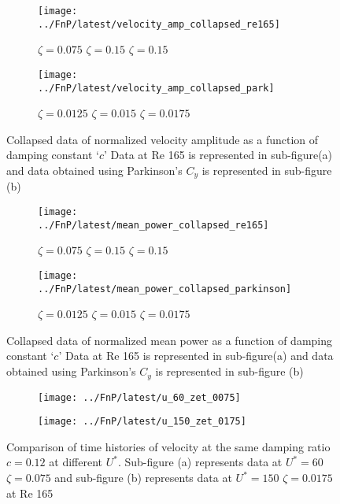 \begin{figure}[h!]
\begin{subfigure}[b]{0.5\textwidth}
\centering
\label{fig:velocity_amp_collapsed_re165}
\texttt{[image: ../FnP/latest/velocity\_amp\_collapsed\_re165]}
\caption{\scriptsize {} $\zeta=0.075$  $\zeta=0.15$  $\zeta=0.15$}
\end{subfigure}
\begin{subfigure}[b]{0.5\textwidth}
\centering
\label{fig:velocity_amp_collapsed_parkinson}
\texttt{[image: ../FnP/latest/velocity\_amp\_collapsed\_park]}
\caption{\scriptsize {} $\zeta=0.0125$  $\zeta=0.015$  $\zeta=0.0175$}
\end{subfigure}
\caption{Collapsed data of normalized velocity amplitude as a function of damping constant `$c$' Data at Re 165 is represented in sub-figure(a) and data obtained using Parkinson's  $C_y$ is represented in sub-figure (b)}
\label{fig:velocity_collapsed}
\end{figure}
\begin{figure}[h!]
\begin{subfigure}[b]{0.5\textwidth}
\centering
\label{fig:mean_power_colapsed_re165}
\texttt{[image: ../FnP/latest/mean\_power\_collapsed\_re165]}
\caption{\scriptsize {} $\zeta=0.075$  $\zeta=0.15$  $\zeta=0.15$}
\end{subfigure}
\begin{subfigure}[b]{0.5\textwidth}
\centering
\label{fig:mean_power_165n}
\texttt{[image: ../FnP/latest/mean\_power\_collapsed\_parkinson]}
\caption{\scriptsize {} $\zeta=0.0125$  $\zeta=0.015$  $\zeta=0.0175$}
\end{subfigure}
\caption{Collapsed data of normalized mean power as a function of damping constant `$c$' Data at Re 165 is represented in sub-figure(a) and data obtained using Parkinson's  $C_y$ is represented in sub-figure (b)}
\label{fig:meanpower_collapsed}
\end{figure}

 
 \begin{figure}[h!]
 \begin{subfigure}[b]{0.5\textwidth}
 \centering
 \label{fig:u_60_zet_0075}
 \texttt{[image: ../FnP/latest/u\_60\_zet\_0075]}
 \caption{}
 \end{subfigure}
 \begin{subfigure}[b]{0.5\textwidth}
 \centering
 \label{fig:u_150_zet_017}
 \texttt{[image: ../FnP/latest/u\_150\_zet\_0175]}
 \caption{}
 \end{subfigure}
 \caption{Comparison of time histories of velocity at the same damping ratio $c=0.12$ at different $U^*$. Sub-figure (a) represents data at $U^*=60$ $\zeta=0.075$ and sub-figure (b) represents data at $U^*=150$ $\zeta=0.0175$ at Re 165 }
 \label{fig:same_max_vel}
 \end{figure}
 
